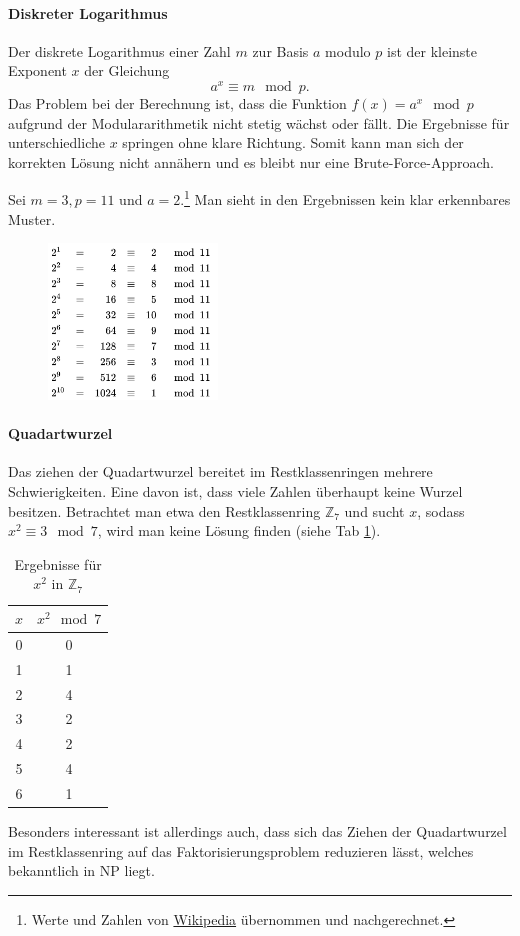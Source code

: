 \paragraph{Diskreter Logarithmus}
Der diskrete Logarithmus einer Zahl $m$ zur Basis $a$ modulo $p$ ist der kleinste Exponent
$x$ der Gleichung
\[
    a^x\equiv m \mod p.
\]
Das Problem bei der Berechnung ist, dass die Funktion $f(x) = a^x \mod p$ aufgrund
der Modulararithmetik nicht stetig wächst oder fällt. Die Ergebnisse für unterschiedliche
$x$ springen ohne klare Richtung. Somit kann man sich der korrekten Lösung
nicht annähern und es bleibt nur eine Brute-Force-Approach.
\begin{example}
    Sei $m = 3, p = 11$ und $a=2$.\footnote{Werte und Zahlen von \href{https://de.wikipedia.org/wiki/Diskreter_Logarithmus\#Beispiel}{Wikipedia} übernommen und nachgerechnet.}
    Man sieht in den Ergebnissen kein klar erkennbares Muster.
    \begin{figure}[h!]
        \centering
        \includegraphics[width=0.4\textwidth]{img/discrete_log.png}
    \end{figure}
\end{example}
\paragraph{Quadartwurzel}
Das ziehen der Quadartwurzel bereitet im Restklassenringen mehrere Schwierigkeiten.
Eine davon ist, dass viele Zahlen überhaupt keine Wurzel besitzen.
Betrachtet man etwa den Restklassenring $\mathbb{Z}_7$ und sucht $x$, sodass
$x^2\equiv 3\mod 7$, wird man keine Lösung finden (siehe Tab \ref{ref:root_example}).
\begin{table}[htbp]
    \centering
    \begin{tabular}{c|c}
        $x$ & $x^2\mod 7$\\\hline
        0 & 0\\
        1 & 1\\
        2 & 4\\
        3 & 2\\
        4 & 2\\
        5 & 4\\
        6 & 1
    \end{tabular}
    \caption{Ergebnisse für $x^2$ in $\mathbb{Z}_7$}
    \label{ref:root_example}
\end{table}
Besonders interessant ist allerdings auch, dass sich das Ziehen der Quadartwurzel
im Restklassenring auf das Faktorisierungsproblem reduzieren lässt, welches
bekanntlich in NP liegt.